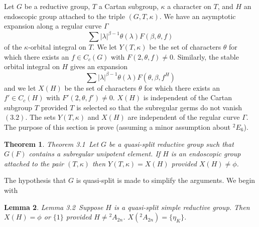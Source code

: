 \documentclass{memo-l}
\newtheorem{theorem}{Theorem}[section]
\newtheorem{lemma}[theorem]{Lemma}
\theoremstyle{definition}
\theoremstyle{remark}
\numberwithin{section}{chapter}
\numberwithin{equation}{chapter}
\begin{document}
   Let $G$ be a reductive group, $T$ a Cartan subgroup, ${\kappa}$ a
character on $T$, and $H$ an endoscopic group attached to the triple
$(G,T,{\kappa})$.  We have an asymptotic expansion along a regular curve
${\Gamma}$
$$
\sum \vert {\lambda}\vert^{{\beta}-1}{\theta}({\lambda})F({\beta},{\theta},f)
$$
of the ${\kappa}$-orbital integral on $T$.  We let $Y(T,{\kappa})$ be the
set of characters ${\theta}$ for which there exists an $f  \in  C_{c}(G)$
with $F(2,{\theta},f) \ne 0$.  Similarly, the stable orbital integral on $H$
gives an expansion
$$
\sum\vert {\lambda}\vert^{{\beta}-1}{\theta}({\lambda})F({\theta},
{\beta},f^{H})
$$
and we let $X(H)$ be the set of characters ${\theta}$ for which there
exists an $f'  \in  C_{c}(H)$ with $F'(2,{\theta},f') \ne 0$.  $X(H)$ is
independent of the Cartan subgroup $T$ provided $T$ is selected so that the
subregular germs do not vanish $(3.2)$.  The sets $Y(T,{\kappa})$ and
$X(H)$ are independent of the regular curve ${\Gamma}$.  The purpose of
this section is prove (assuming a minor assumption about ${}^2E_6$).

\begin{theorem}{Theorem 3.1}\ Let $G$ be a quasi-split reductive group such
that $G(F)$ contains a subregular unipotent element.  If $H$ is an
endoscopic group attached to the pair $(T,{\kappa})$ then $Y(T,{\kappa})  = 
X(H)$ provided $X(H)  \ne {\phi}$.
\end{theorem}

\medpagebreak

The hypothesis that $G$ is quasi-split is made to simplify the arguments.
We begin with

\begin{lemma}{Lemma 3.2}\ Suppose $H$ is a quasi-split simple reductive
group.  Then  $X(H) = {\phi}$ or $\{1\}$ provided $H \ne {{}^{2}A_{2n}}$.  
$X(^{2}A_{2n})  = \{{\eta}_{K}\}$.
\end{lemma}
\end{document}
